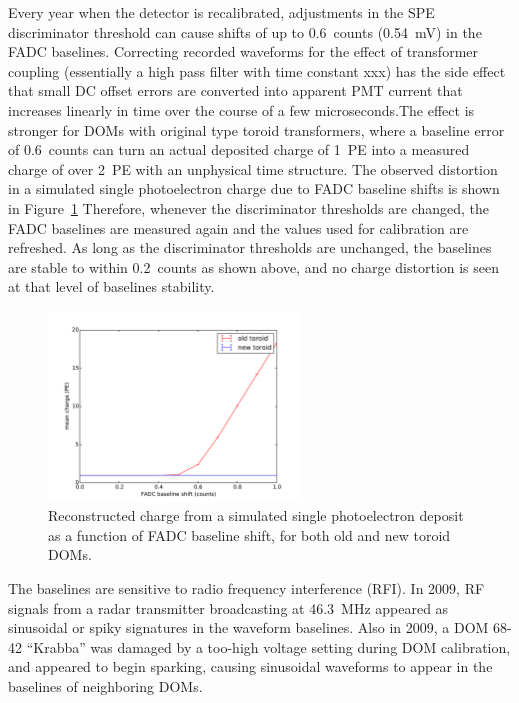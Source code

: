 Every year when the detector
is recalibrated, adjustments in the SPE discriminator threshold can
cause shifts of up to 0.6~counts (0.54~mV) in the FADC
baselines. Correcting recorded waveforms for the effect of transformer
coupling (essentially a high pass filter with time constant xxx) has
the side effect that small DC offset errors are converted into
apparent PMT current that increases linearly in time over the course
of a few microseconds.The effect is stronger for DOMs with original
type toroid transformers, where a baseline error of 0.6~counts can
turn an actual deposited charge of 1~PE into a measured charge of over
2~PE with an unphysical time structure. The observed distortion in a
simulated single photoelectron charge due to FADC baseline shifts is
shown in Figure~\ref{fig:charge_fadcshift}  Therefore, whenever the
discriminator thresholds are changed, the FADC baselines are measured
again and the values used for calibration are refreshed. As long as
the discriminator thresholds are unchanged, the baselines are stable
to within 0.2~counts
as shown above, and no charge distortion is seen at that level of
baselines stability.

\begin{figure}[!h]
 \centering
 \includegraphics[width=0.6\textwidth]{graphics/dom/reliability/charge_fadcshift.pdf}
 \caption{Reconstructed charge from a simulated single photoelectron
   deposit as a function of FADC baseline shift, for both old and new
   toroid DOMs.}
 \label{fig:charge_fadcshift}
\end{figure}

The baselines are sensitive to radio frequency interference (RFI). In
2009, RF signals from a radar transmitter broadcasting at 46.3~MHz
appeared as sinusoidal or spiky signatures in the waveform
baselines. Also in 2009, a DOM 68-42 ``Krabba'' was damaged by a too-high
voltage setting during DOM calibration, and appeared to begin
sparking, causing sinusoidal waveforms to appear in the baselines of
neighboring DOMs.


